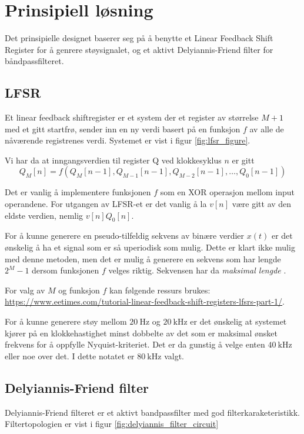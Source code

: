 \section{Prinsipiell løsning}
\label{prinsipiellLoesning}
Det prinsipielle designet baserer seg på å benytte et Linear Feedback Shift Register for å genrere 
støysignalet, og et aktivt Delyiannis-Friend filter for båndpassfilteret.

\subsection{LFSR}
Et linear feedback shiftregister er et system der et register av størrelse $M + 1$ med et gitt startfrø, 
sender inn en ny verdi basert på en funksjon $f$ av alle de nåværende registrenes verdi. Systemet er vist i
figur \ref{fig:lfsr_figure}. 

Vi har da at inngangsverdien til register Q ved klokkesyklus $n$ er gitt 
\[
    Q_M[n] = f(Q_M[n-1], Q_{M-1}[n-1], Q_{M-2}[n-1], \dots, Q_0[n-1])
\]

Det er vanlig å implementere funksjonen $f$ som en XOR operasjon mellom input operandene. For utgangen
av LFSR-et er det vanlig å la $v[n]$ være gitt av den eldste verdien, nemlig $v[n] Q_0[n]$.

For å kunne generere en pseudo-tilfeldig sekvens av binære verdier $x(t)$ er det ønskelig å ha et signal som er 
så uperiodisk som mulig. Dette er klart ikke mulig med denne metoden, men det er mulig å generere en sekvens som 
har lengde $2^M - 1$ dersom funksjonen $f$ velges riktig. Sekvensen har da \textit{maksimal lengde} \cite{lfsr_max_length}.

For valg av $M$ og funksjon $f$ kan følgende ressurs brukes: \\ \url{https://www.eetimes.com/tutorial-linear-feedback-shift-registers-lfsrs-part-1/}.

For å kunne generere støy mellom $\SI{20}{\hertz}$ og $\SI{20}{\kilo\hertz}$ er det ønskelig at systemet kjører på en 
klokkehastighet minst dobbelte av det som er maksimal ønsket frekvens for å oppfylle Nyquist-kriteriet. Det er da gunstig 
å velge enten $\SI{40}{\kilo\hertz}$ eller noe over det. I dette notatet er $\SI{80}{\kilo\hertz}$ valgt.

\subsection{Delyiannis-Friend filter}
Delyiannis-Friend filteret er et aktivt bandpassfilter med god filterkaraketeristikk. Filtertopologien er vist 
i figur \ref{fig:delyiannis_filter_circuit}

